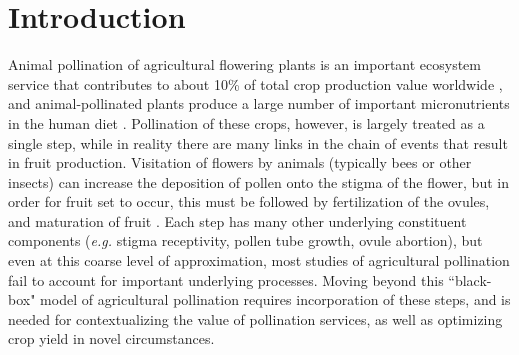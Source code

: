 \documentclass[12pt]{article} %
\begin{document}
\section*{Introduction}
Animal pollination of agricultural flowering plants is an important ecosystem service that contributes to about 10\% of total crop production value worldwide \citep{gallai2009}, and animal-pollinated plants produce a large number of important micronutrients in the human diet \citep{eilers2011}.
Pollination of these crops, however, is largely treated as a single step, while in reality there are many links in the chain of events that result in fruit production.
Visitation of flowers by animals (typically bees or other insects) can increase the deposition of pollen onto the stigma of the flower, but in order for fruit set to occur, this must be followed by fertilization of the ovules, and maturation of fruit \citep{erbar2003, goldberg1994}.
Each step has many other underlying constituent components (\textit{e.g.} stigma receptivity, pollen tube growth, ovule abortion), but even at this coarse level of approximation, most studies of agricultural pollination fail to account for important underlying processes.
Moving beyond this ``black-box" model of agricultural pollination requires incorporation of these steps, and is needed for contextualizing the value of pollination services, as well as optimizing crop yield in novel circumstances.



\end{document}

